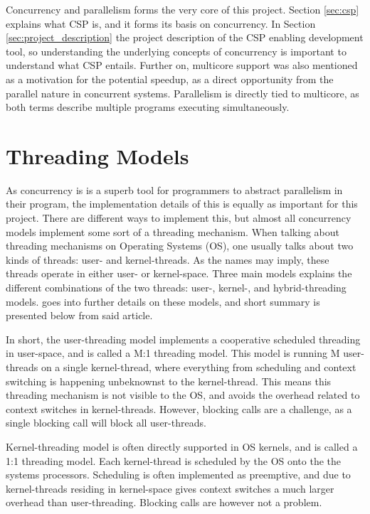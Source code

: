Concurrency and parallelism forms the very core of this project. Section \ref{sec:csp} explains what CSP is, and it forms its basis on concurrency. In Section \ref{sec:project_description} the project description of the CSP enabling development tool, so understanding the underlying concepts of concurrency is important to understand what CSP entails. Further on, multicore support was also mentioned as a motivation for the potential speedup, as a direct opportunity from the parallel nature in concurrent systems. Parallelism is directly tied to multicore, as both terms describe multiple programs executing simultaneously. 


\section{Threading Models}
\label{sec:threadingmodels}

As concurrency is is a superb tool for programmers to abstract parallelism in their program, the implementation details of this is equally as important for this project. There are different ways to implement this, but almost all concurrency models implement some sort of a threading mechanism. When talking about threading mechanisms on Operating Systems (OS), one usually talks about two kinds of threads: user- and kernel-threads. As the names may imply, these threads operate in either user- or kernel-space. Three main models explains the different combinations of the two threads: user-, kernel-, and hybrid-threading models. \citet{c++csp2} goes into further details on these models, and short summary is presented below from said article.

In short, the user-threading model implements a cooperative scheduled threading in user-space, and is called a M:1 threading model. This model is running M user-threads on a single kernel-thread, where everything from scheduling and context switching is happening unbeknownst to the kernel-thread. This means this threading mechanism is not visible to the OS, and avoids the overhead related to context switches in kernel-threads. However, blocking calls are a challenge, as a single blocking call will block all user-threads.

Kernel-threading model is often directly supported in OS kernels, and is called a 1:1 threading model. Each kernel-thread is scheduled by the OS onto the the systems processors. Scheduling is often implemented as preemptive, and due to kernel-threads residing in kernel-space gives context switches a much larger overhead than user-threading. Blocking calls are however not a problem. 

